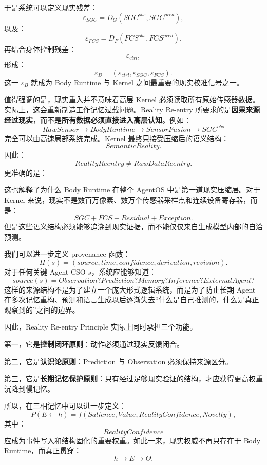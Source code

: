 于是系统可以定义现实残差：
\[
\varepsilon_{SGC}
=
D_G
\left(
SGC^{obs},
SGC^{pred}
\right),
\]
以及：
\[
\varepsilon_{FCS}
=
D_F
\left(
FCS^{obs},
FCS^{pred}
\right).
\]
再结合身体控制残差：
\[
\varepsilon_{ctrl},
\]
形成：
\[
\boxed{
\varepsilon_B
=
\left(
\varepsilon_{ctrl},
\varepsilon_{SGC},
\varepsilon_{FCS}
\right).
}
\]
这一 $\varepsilon_B$ 就成为 Body Runtime 与 Kernel 之间最重要的现实校准信号之一。

值得强调的是，现实重入并不意味着高层 Kernel 必须读取所有原始传感器数据。实际上，这会重新制造工作记忆过载问题。Reality Re-entry 所要求的是\textbf{因果来源经过现实}，而不是\textbf{所有数据必须直接进入高层认知}。例如：
\[
RawSensor
\rightarrow
BodyRuntime
\rightarrow
SensorFusion
\rightarrow
SGC^{obs}
\]
完全可以由高速局部系统完成。Kernel 最终只接受压缩后的语义结构：
\[
SemanticReality.
\]
因此：
\[
RealityReentry
\neq
RawDataReentry.
\]
更准确的是：
\begin{statementbox}
\centering
{}
\end{statementbox}

这也解释了为什么 Body Runtime 在整个 AgentOS 中是第一道现实压缩层。对于 Kernel 来说，现实不是数百万像素、数万个传感器采样点和连续设备寄存器，而是：
\[
SGC+FCS+Residual+Exception.
\]
但是这些语义结构必须能够追溯到现实证据，而不能仅仅来自生成模型内部的自洽预测。

我们可以进一步定义 provenance 函数：
\[
\Pi(s)
=
\left(
source,
time,
confidence,
derivation,
revision
\right).
\]
对于任何关键 Agent-CSO $s$，系统应能够知道：
\[
source(s)
=
Observation?
Prediction?
Memory?
Inference?
ExternalAgent?
\]
这样的来源结构不是为了建立一个庞大形式逻辑系统，而是为了防止长期 Agent 在多次记忆重构、预测和语言生成以后逐渐失去``什么是自己推测的，什么是真正观察到的''之间的边界。

因此，Reality Re-entry Principle 实际上同时承担三个功能。

第一，它是\textbf{控制闭环原则}：动作必须通过现实反馈闭合。

第二，它是\textbf{认识论原则}：Prediction 与 Observation 必须保持来源区分。

第三，它是\textbf{长期记忆保护原则}：只有经过足够现实验证的结构，才应获得更高权重沉降到慢记忆。

所以，在三相记忆中可以进一步定义：
\[
P(E\leftarrow h)
=
f(
Salience,
Value,
RealityConfidence,
Novelty
),
\]
其中：
\[
RealityConfidence
\]
应成为事件写入和结构固化的重要权重。如此一来，现实权威不再只存在于 Body Runtime，而真正贯穿：
\[
h\rightarrow E\rightarrow\Theta.
\]

